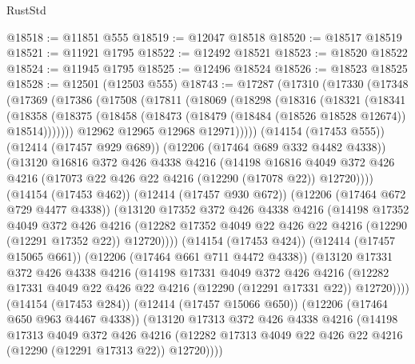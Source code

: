 \begin{lexlean}{RustStd}
\begin{coremodule}
@18518 := @11851 @555
@18519 := @12047 @18518
@18520 := @18517 @18519
@18521 := @11921 @1795
@18522 := @12492 @18521
@18523 := @18520 @18522
@18524 := @11945 @1795
@18525 := @12496 @18524
@18526 := @18523 @18525
@18528 := @12501 (@12503 @555)
@18743 := @17287
    (@17310
      (@17330
        (@17348
          (@17369
            (@17386
              (@17508
                (@17811
                  (@18069
                    (@18298
                      (@18316
                        (@18321
                          (@18341
                            (@18358
                              (@18375
                                (@18458
                                  (@18473 (@18479 (@18484 (@18526 @18528 @12674)) @18514)))))))
                        @12962
                        @12965
                        @12968
                        @12971)))))
              (@14154 (@17453 @555))
              (@12414 (@17457 @929 @689))
              (@12206 (@17464 @689 @332 @4482 @4338))
              (@13120
                @16816
                @372
                @426
                @4338
                @4216
                (@14198
                  @16816
                  @4049
                  @372
                  @426
                  @4216
                  (@17073 @22 @426 @22 @4216 (@12290 (@17078 @22)) @12720))))
            (@14154 (@17453 @462))
            (@12414 (@17457 @930 @672))
            (@12206 (@17464 @672 @729 @4477 @4338))
            (@13120
              @17352
              @372
              @426
              @4338
              @4216
              (@14198
                @17352
                @4049
                @372
                @426
                @4216
                (@12282 @17352 @4049 @22 @426 @22 @4216 (@12290 (@12291 @17352 @22)) @12720))))
          (@14154 (@17453 @424))
          (@12414 (@17457 @15065 @661))
          (@12206 (@17464 @661 @711 @4472 @4338))
          (@13120
            @17331
            @372
            @426
            @4338
            @4216
            (@14198
              @17331
              @4049
              @372
              @426
              @4216
              (@12282 @17331 @4049 @22 @426 @22 @4216 (@12290 (@12291 @17331 @22)) @12720))))
        (@14154 (@17453 @284))
        (@12414 (@17457 @15066 @650))
        (@12206 (@17464 @650 @963 @4467 @4338))
        (@13120
          @17313
          @372
          @426
          @4338
          @4216
          (@14198
            @17313
            @4049
            @372
            @426
            @4216
            (@12282 @17313 @4049 @22 @426 @22 @4216 (@12290 (@12291 @17313 @22)) @12720))))

\end{coremodule}
\end{lexlean}
